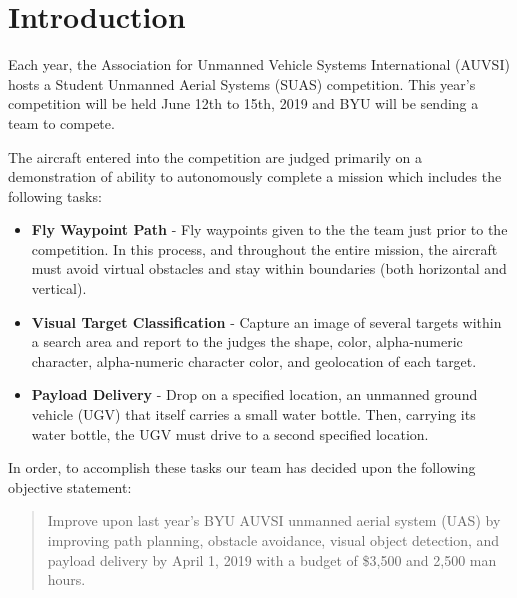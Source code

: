 \documentclass[]{auvsi_doc}
\begin{document}
\begin{AUVSITitlePage}
\begin{artifacttable}
\end{artifacttable}
\end{AUVSITitlePage}


\section{ Introduction}

Each year, the Association for Unmanned Vehicle Systems International (AUVSI) hosts a Student Unmanned Aerial Systems (SUAS) competition. This year’s competition will be held June 12th to 15th, 2019 and BYU will be sending a team to compete.

The aircraft entered into the competition are judged primarily on a demonstration of ability to autonomously complete a mission which includes the following tasks:

\begin{itemize}
	\item\textbf{Fly Waypoint Path} - Fly waypoints given to the the team just prior to the competition. In this process, and throughout the entire mission, the aircraft must avoid virtual obstacles and stay within boundaries (both horizontal and vertical).
	\item\textbf{Visual Target Classification} - Capture an image of several targets within a search area and report to the judges the shape, color, alpha-numeric character, alpha-numeric character color, and geolocation of each target.
	\item\textbf{Payload Delivery} - Drop on a specified location, an unmanned ground vehicle (UGV) that itself carries a small water bottle. Then, carrying its water bottle, the UGV must drive to a second specified location.
\end{itemize}

In order, to accomplish these tasks our team has decided upon the following objective statement:

\begin{quote}
Improve upon last year’s BYU AUVSI unmanned aerial system (UAS) by improving path planning, obstacle avoidance, visual object detection, and payload delivery by April 1, 2019 with a budget of \$3,500 and 2,500 man hours.
\end{quote}
\end{document}
